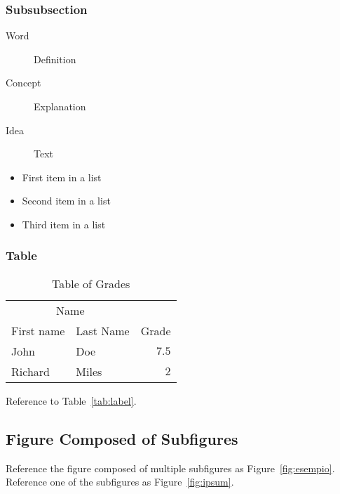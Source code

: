 \documentclass[
10pt, %
a4paper, %
oneside, %
headinclude,footinclude, %
BCOR5mm, %
]{scrartcl}
\begin{document}
\lipsum[11] %

\subsubsection{Subsubsection}

\lipsum[12] %

\begin{description}
\item[Word] Definition
\item[Concept] Explanation
\item[Idea] Text
\end{description}

\lipsum[12] %

\begin{itemize}[noitemsep] %
\item First item in a list
\item Second item in a list
\item Third item in a list
\end{itemize}

\subsubsection{Table}



\begin{table}[hbt]
\caption{Table of Grades}
\centering
\begin{tabular}{llr}
\toprule
\multicolumn{2}{c}{Name} \\
\cmidrule(r){1-2}
First name & Last Name & Grade \\
\midrule
John & Doe & $7.5$ \\
Richard & Miles & $2$ \\
\bottomrule
\end{tabular}
\label{tab:label}
\end{table}

Reference to Table~\vref{tab:label}. %


\subsection{Figure Composed of Subfigures}

Reference the figure composed of multiple subfigures as Figure~\vref{fig:esempio}. Reference one of the subfigures as Figure~\vref{fig:ipsum}. %
\end{document}
